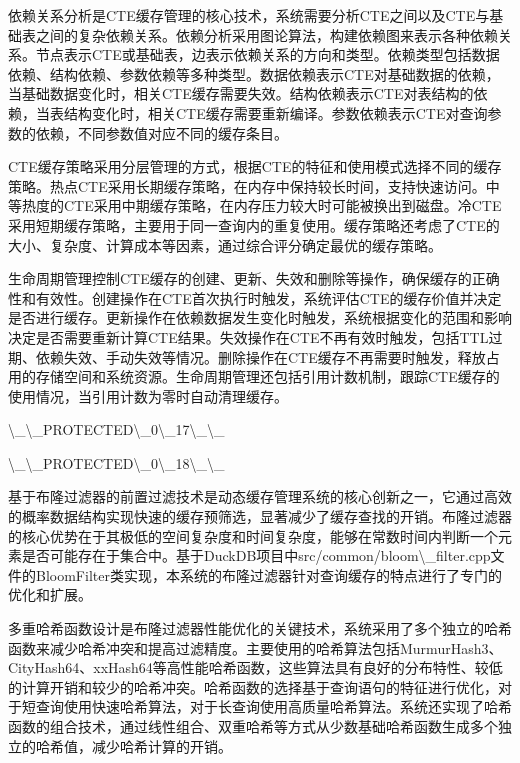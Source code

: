 依赖关系分析是CTE缓存管理的核心技术，系统需要分析CTE之间以及CTE与基础表之间的复杂依赖关系。依赖分析采用图论算法，构建依赖图来表示各种依赖关系。节点表示CTE或基础表，边表示依赖关系的方向和类型。依赖类型包括数据依赖、结构依赖、参数依赖等多种类型。数据依赖表示CTE对基础数据的依赖，当基础数据变化时，相关CTE缓存需要失效。结构依赖表示CTE对表结构的依赖，当表结构变化时，相关CTE缓存需要重新编译。参数依赖表示CTE对查询参数的依赖，不同参数值对应不同的缓存条目。

CTE缓存策略采用分层管理的方式，根据CTE的特征和使用模式选择不同的缓存策略。热点CTE采用长期缓存策略，在内存中保持较长时间，支持快速访问。中等热度的CTE采用中期缓存策略，在内存压力较大时可能被换出到磁盘。冷CTE采用短期缓存策略，主要用于同一查询内的重复使用。缓存策略还考虑了CTE的大小、复杂度、计算成本等因素，通过综合评分确定最优的缓存策略。

生命周期管理控制CTE缓存的创建、更新、失效和删除等操作，确保缓存的正确性和有效性。创建操作在CTE首次执行时触发，系统评估CTE的缓存价值并决定是否进行缓存。更新操作在依赖数据发生变化时触发，系统根据变化的范围和影响决定是否需要重新计算CTE结果。失效操作在CTE不再有效时触发，包括TTL过期、依赖失效、手动失效等情况。删除操作在CTE缓存不再需要时触发，释放占用的存储空间和系统资源。生命周期管理还包括引用计数机制，跟踪CTE缓存的使用情况，当引用计数为零时自动清理缓存。

\textbackslash{}_\textbackslash{}_PROTECTED\textbackslash{}_0\textbackslash{}_17\textbackslash{}_\textbackslash{}_

\textbackslash{}_\textbackslash{}_PROTECTED\textbackslash{}_0\textbackslash{}_18\textbackslash{}_\textbackslash{}_

基于布隆过滤器的前置过滤技术是动态缓存管理系统的核心创新之一，它通过高效的概率数据结构实现快速的缓存预筛选，显著减少了缓存查找的开销。布隆过滤器的核心优势在于其极低的空间复杂度和时间复杂度，能够在常数时间内判断一个元素是否可能存在于集合中。基于DuckDB项目中src/common/bloom\textbackslash{}_filter.cpp文件的BloomFilter类实现，本系统的布隆过滤器针对查询缓存的特点进行了专门的优化和扩展。

多重哈希函数设计是布隆过滤器性能优化的关键技术，系统采用了多个独立的哈希函数来减少哈希冲突和提高过滤精度。主要使用的哈希算法包括MurmurHash3、CityHash64、xxHash64等高性能哈希函数，这些算法具有良好的分布特性、较低的计算开销和较少的哈希冲突。哈希函数的选择基于查询语句的特征进行优化，对于短查询使用快速哈希算法，对于长查询使用高质量哈希算法。系统还实现了哈希函数的组合技术，通过线性组合、双重哈希等方式从少数基础哈希函数生成多个独立的哈希值，减少哈希计算的开销。

